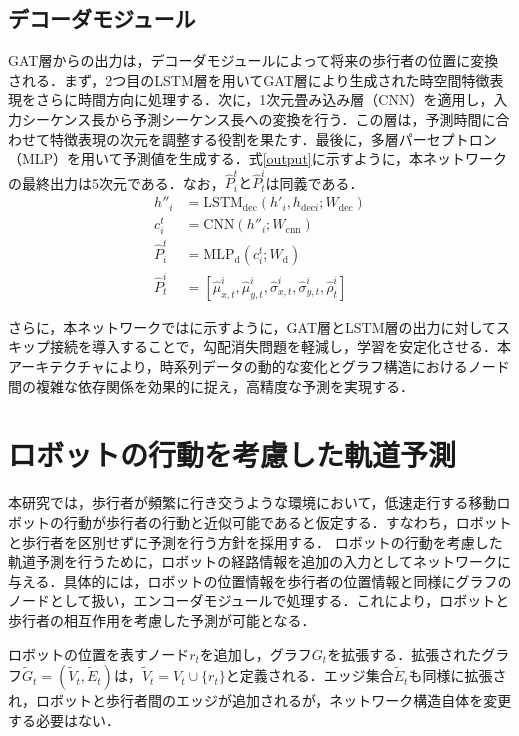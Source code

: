 \subsection{デコーダモジュール}\label{sec:decoder}
GAT層からの出力は，デコーダモジュールによって将来の歩行者の位置に変換される．まず，2つ目のLSTM層を用いてGAT層により生成された時空間特徴表現をさらに時間方向に処理する．次に，1次元畳み込み層（CNN）を適用し，入力シーケンス長から予測シーケンス長への変換を行う．この層は，予測時間に合わせて特徴表現の次元を調整する役割を果たす．最後に，多層パーセプトロン（MLP）を用いて予測値を生成する．式\eqref{output}に示すように，本ネットワークの最終出力は5次元である．なお，$\hat{P}^t_i\text{と}\hat{P}^i_t$は同義である．
\begin{align}
  h''_i &= \text{LSTM}_{\text{dec}}(h'_i, h_{\text{dec}i}; W_{\text{dec}})\\
  c^t_i &= \text{CNN}(h''_i; W_{\text{cnn}}) \\
  \hat{P}^t_i &= \text{MLP}_{\text{d}}(c^t_i; W_{\text{d}}) \\
  \hat{P}^i_t &= [\hat{\mu}^i_{x,t}, \hat{\mu}^i_{y, t}, \hat{\sigma}^i_{x, t}, \hat{\sigma}^i_{y, t}, \hat{\rho}^i_t] \label{output}
\end{align}

さらに，本ネットワークではに示すように，GAT層とLSTM層の出力に対してスキップ接続\cite{he2016deep-resnet}を導入することで，勾配消失問題\cite{hochreiter2001gradient-grad,weinleindiplomarbeit-grad, schmidhuber2015deep-grad}を軽減し，学習を安定化させる．本アーキテクチャにより，時系列データの動的な変化とグラフ構造におけるノード間の複雑な依存関係を効果的に捉え，高精度な予測を実現する．

\section{ロボットの行動を考慮した軌道予測}
本研究では，歩行者が頻繁に行き交うような環境において，低速走行する移動ロボットの行動が歩行者の行動と近似可能であると仮定する．すなわち，ロボットと歩行者を区別せずに予測を行う方針を採用する．
ロボットの行動を考慮した軌道予測を行うために，ロボットの経路情報を追加の入力としてネットワークに与える．具体的には，ロボットの位置情報を歩行者の位置情報と同様にグラフのノードとして扱い，エンコーダモジュールで処理する．これにより，ロボットと歩行者の相互作用を考慮した予測が可能となる．

ロボットの位置を表すノード$r_t$を追加し，グラフ$G_t$を拡張する．拡張されたグラフ$\tilde{G}_t = (\tilde{V}_t, \tilde{E}_t)$は，$\tilde{V}_t = V_t \cup \{ r_t \}$と定義される．エッジ集合$\tilde{E}_t$も同様に拡張され，ロボットと歩行者間のエッジが追加されるが，ネットワーク構造自体を変更する必要はない．

